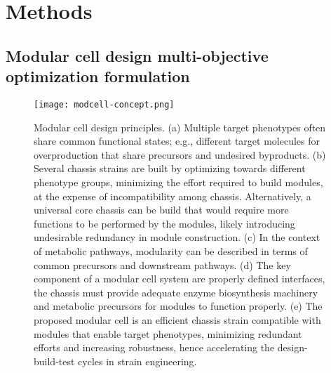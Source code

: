 

\section{Methods}
\subsection{Modular cell design multi-objective optimization formulation}

\begin{figure}[hp]
    \centering
    \texttt{[image: modcell-concept.png]}
    \caption[Modular cell design principles]{Modular cell design principles. (a) Multiple target phenotypes often share common functional states; e.g., different target molecules for overproduction that share precursors and undesired byproducts.
    (b) Several chassis strains are built by optimizing towards different phenotype groups, minimizing the effort required to build modules, at the expense of incompatibility among chassis. Alternatively, a universal core chassis can be build that would require more functions to be performed by the modules, likely introducing undesirable redundancy in module construction.
    (c) In the context of metabolic pathways, modularity can be described in terms of common precursors and downstream pathways.
    (d) The key component of a modular cell system are properly defined interfaces, the chassis must provide adequate enzyme biosynthesis machinery and metabolic precursors for modules to function properly. (e) The proposed modular cell is an efficient chassis strain compatible with modules that enable target phenotypes, minimizing redundant efforts and increasing robustness, hence accelerating the design-build-test cycles in strain engineering.
    }
    \label{fig7:modcell}
\end{figure}

